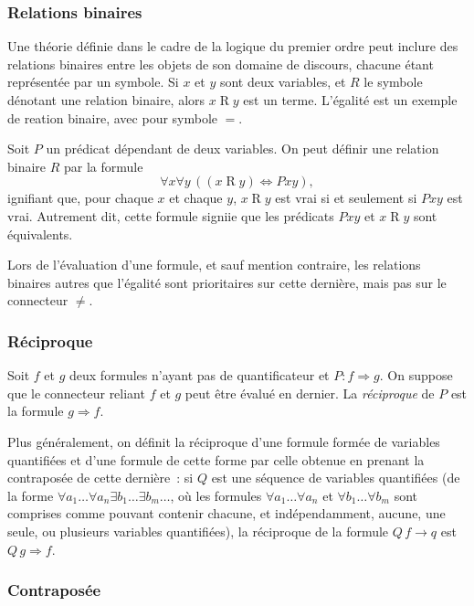 \subsubsection{Relations binaires} 

Une théorie définie dans le cadre de la logique du premier ordre peut inclure des relations binaires entre les objets de son domaine de discours, chacune étant représentée par un symbole. 
Si $x$ et $y$ sont deux variables, et $R$ le symbole dénotant une relation binaire, alors $x \mathrel{R} y$ est un terme. 
L'égalité est un exemple de reation binaire, avec pour symbole $=$. 

Soit $P$ un prédicat dépendant de deux variables. 
On peut définir une relation binaire $R$ par la formule 
\begin{equation*}
    \forall x \forall y \, ((x \mathrel{R} y) \Leftrightarrow P x y),
\end{equation*}
ignifiant que, pour chaque $x$ et chaque $y$, $x \mathrel{R} y$ est vrai si et seulement si $P x y$ est vrai. 
Autrement dit, cette formule signiie que les prédicats $P x y$ et $x \mathrel{R} y$ sont équivalents.

Lors de l'évaluation d'une formule, et sauf mention contraire, les relations binaires autres que l'égalité sont prioritaires sur cette dernière, mais pas sur le connecteur $\neq$.

\subsubsection{Réciproque}

Soit $f$ et $g$ deux formules n'ayant pas de quantificateur et $P: f \Rightarrow g$. 
On suppose que le connecteur reliant $f$ et $g$ peut être évalué en dernier.
La \textit{réciproque} de $P$ est la formule $g \Rightarrow f$. 

Plus généralement, on définit la réciproque d'une formule formée de variables quantifiées et d'une formule de cette forme par celle obtenue en prenant la contraposée de cette dernière : si $Q$ est une séquence de variables quantifiées (de la forme $\forall a_1 \dots \forall a_n \exists b_1 \dots \exists b_m \dots$, où les formules $\forall a_1 \dots \forall a_n$ et $\forall b_1 \dots \forall b_m$ sont comprises comme pouvant contenir chacune, et indépendamment, aucune, une seule, ou plusieurs variables quantifiées), la réciproque de la formule $Q \, f \rightarrow q$ est $Q \, g \Rightarrow f$. 

\subsubsection{Contraposée}

